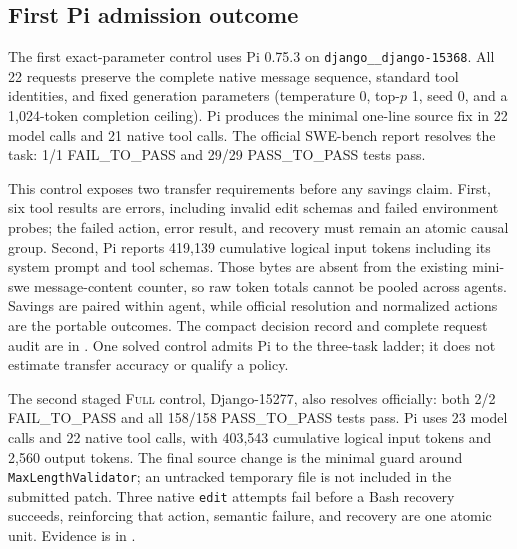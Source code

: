 \documentclass[11pt]{article}
\begin{document}
\subsection{First Pi admission outcome}

The first exact-parameter control uses Pi 0.75.3 on
\texttt{django\_\_django-15368}.  All 22 requests preserve the complete native
message sequence, standard tool identities, and fixed generation parameters
(temperature 0, top-$p$ 1, seed 0, and a 1,024-token completion ceiling).  Pi
produces the minimal one-line source fix in 22 model calls and 21 native tool
calls.  The official SWE-bench report resolves the task: 1/1
FAIL\_TO\_PASS and 29/29 PASS\_TO\_PASS tests pass.

This control exposes two transfer requirements before any savings claim.
First, six tool results are errors, including invalid edit schemas and failed
environment probes; the failed action, error result, and recovery must remain
an atomic causal group.  Second, Pi reports 419,139 cumulative logical input
tokens including its system prompt and tool schemas.  Those bytes are absent
from the existing mini-swe message-content counter, so raw token totals cannot
be pooled across agents.  Savings are paired within agent, while official
resolution and normalized actions are the portable outcomes.  The compact
decision record and complete request audit are in
.  One solved control
admits Pi to the three-task ladder; it does not estimate transfer accuracy or
qualify a policy.

The second staged \textsc{Full} control, Django-15277, also resolves
officially: both 2/2 FAIL\_TO\_PASS and all 158/158 PASS\_TO\_PASS tests pass.
Pi uses 23 model calls and 22 native tool calls, with 403,543 cumulative logical
input tokens and 2,560 output tokens.  The final source change is the minimal
guard around \texttt{MaxLengthValidator}; an untracked temporary file is not
included in the submitted patch.  Three native \texttt{edit} attempts fail
before a Bash recovery succeeds, reinforcing that action, semantic failure,
and recovery are one atomic unit.  Evidence is in
.
\end{document}
